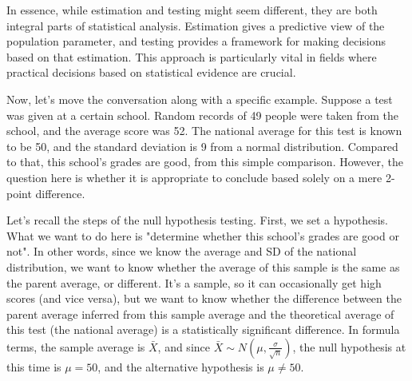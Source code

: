\documentclass{ltjsbook}
\begin{document}
In essence, while estimation and testing might seem different, they are both integral parts of statistical analysis. Estimation gives a predictive view of the population parameter, and testing provides a framework for making decisions based on that estimation. This approach is particularly vital in fields where practical decisions based on statistical evidence are crucial.

Now, let's move the conversation along with a specific example. Suppose a test was given at a certain school. Random records of 49 people were taken from the school, and the average score was 52. The national average for this test is known to be 50, and the standard deviation is 9 from a normal distribution. Compared to that, this school's grades are good, from this simple comparison. However, the question here is whether it is appropriate to conclude based solely on a mere 2-point difference.

Let's recall the steps of the null hypothesis testing. First, we set a hypothesis.
What we want to do here is "determine whether this school's grades are good or not". In other words, since we know the average and SD of the national distribution, we want to know whether the average of this sample is the same as the parent average, or different. It's a sample, so it can occasionally get high scores (and vice versa), but we want to know whether the difference between the parent average inferred from this sample average and the theoretical average of this test (the national average) is a statistically significant difference. In formula terms, the sample average is $\bar{X}$, and since $\bar{X} \sim N(\mu, \frac{\sigma}{\sqrt{n}})$, the null hypothesis at this time is $\mu=50$, and the alternative hypothesis is $\mu \neq 50$.
\end{document}
